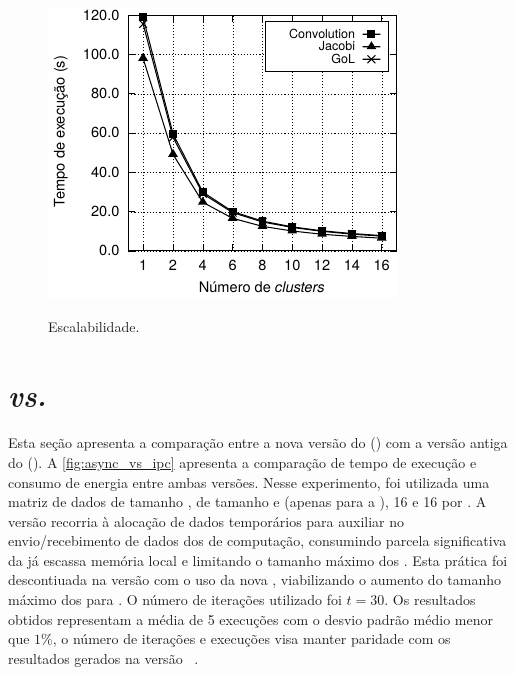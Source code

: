 \begin{figure}
	\centering
	\caption{Escalabilidade.}
	\includegraphics[width=.6\textwidth]{figs/MPPAPlotScalabilityAPI.pdf}
	\label{fig:escalabilidade}
\end{figure}

\section{\mppa \async \textit{vs.} \mppa \ipc}
\label{sec:async_vs_ipc}

Esta seção apresenta a comparação entre a nova versão do \pskelmppa (\async) com a versão antiga do \pskelmppa (\ipc). 
A \autoref{fig:async_vs_ipc} apresenta a comparação de tempo de execução e consumo de energia entre ambas versões.
Nesse experimento, foi utilizada uma matriz de dados de tamanho \ind, \tiles de tamanho \tilec e \tiled (apenas para a \async), 16 \clusters e 16 \pes por \cluster.
A versão \ipc recorria à alocação de dados temporários para auxiliar no envio/recebimento de dados dos \clusters de computação, consumindo parcela significativa da já escassa memória local e limitando o tamanho máximo dos \tiles.
Esta prática foi descontiuada na versão \async com o uso da nova \api, viabilizando o aumento do tamanho máximo dos \tiles para \tiled.
O número de iterações utilizado foi $t = 30$. Os resultados obtidos representam a média de 5 execuções com o desvio padrão médio menor que $1\%$, o número de iterações e execuções visa manter paridade com os resultados gerados na versão \ipc~\cite{Podesta:TCC}. 

